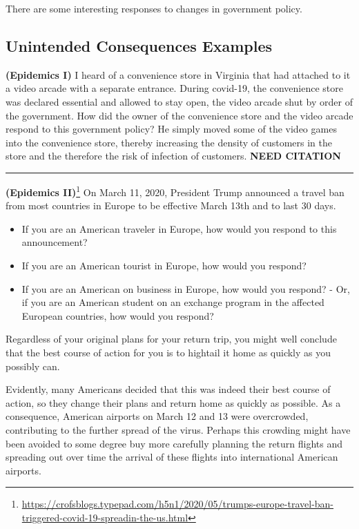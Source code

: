 \documentclass[
]{book}
\providecommand{\tightlist}{%
  \setlength{\itemsep}{0pt}\setlength{\parskip}{0pt}}
\begin{document}
There are some interesting responses to changes in government policy.

\hypertarget{unintended-consequences-examples}{%
\subsection{Unintended Consequences Examples}\label{unintended-consequences-examples}}

\textbf{(Epidemics I)} I heard of a convenience store in Virginia that had attached to it a video arcade with a separate entrance. During covid-19, the convenience store was declared essential and allowed to stay open, the video arcade shut by order of the government. How did the owner of the convenience store and the video arcade respond to this government policy? He simply moved some of the video games into the convenience store, thereby increasing the density of customers in the store and the therefore the risk of infection of customers. \textbf{NEED CITATION}

\begin{center}\rule{0.5\linewidth}{0.5pt}\end{center}

\textbf{(Epidemics II)}\footnote{\url{https://crofsblogs.typepad.com/h5n1/2020/05/trumps-europe-travel-ban-triggered-covid-19-spreadin-the-us.html}} On March 11, 2020, President Trump announced a travel ban from most countries in Europe to be effective March 13th and to last 30 days.

\begin{itemize}
\tightlist
\item
  If you are an American traveler in Europe, how would you respond to this announcement?
\item
  If you are an American tourist in Europe, how would you respond?
\item
  If you are an American on business in Europe, how would you respond? - Or, if you are an American student on an exchange program in the affected European countries, how would you respond?
\end{itemize}

Regardless of your original plans for your return trip, you might well conclude that the best course of action for you is to hightail it home as quickly as you possibly can.

Evidently, many Americans decided that this was indeed their best course of action, so they change their plans and return home as quickly as possible. As a consequence, American airports on March 12 and 13 were overcrowded, contributing to the further spread of the virus. Perhaps this crowding might have been avoided to some degree buy more carefully planning the return flights and spreading out over time the arrival of these flights into international American airports.
\end{document}
